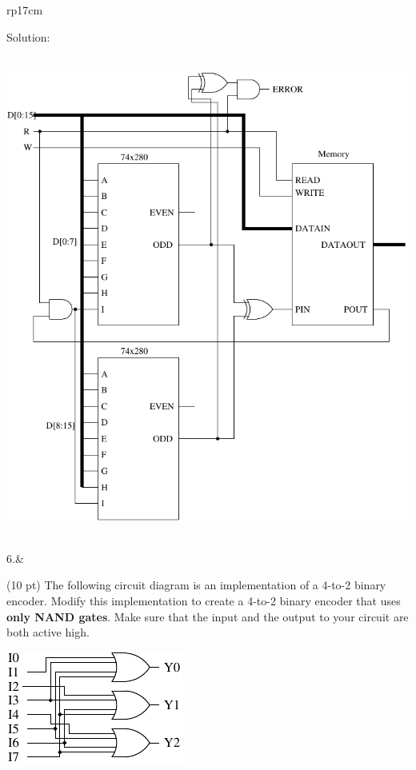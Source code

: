 \documentclass{article}
\begin{document}
\begin{longtable}[l]{rp{17cm}}
\begin{minipage}[t]{\linewidth}
Solution: \\ \\
\begin{center}
  \includegraphics[scale=0.8]{../XOR/Assessments/MemoryCircuitParityExtendedSolution} \\
\end{center}
\end{minipage}\\
\medskip
6.&\begin{minipage}[t]{\linewidth}(10 pt) The following circuit diagram is an implementation of a 4-to-2 binary encoder.  Modify this implementation to create a 4-to-2 binary encoder that uses \textbf{only NAND gates}.  Make sure that the input and the output to your circuit are both active high.
\begin{center}
  \includegraphics{../Encoders/Assessments/BinaryEncoderLogic}
\end{center}


\end{minipage}
\end{longtable}
\end{document}

